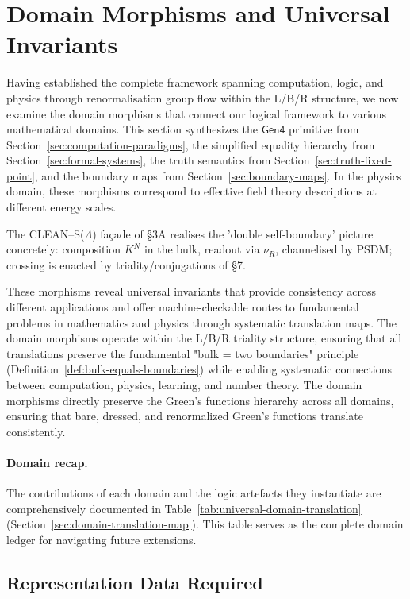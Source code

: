 \section{Domain Morphisms and Universal Invariants}
\label{sec:unified-theory}

Having established the complete framework spanning computation, logic, and physics through renormalisation group flow within the L/B/R structure, we now examine the domain morphisms that connect our logical framework to various mathematical domains. This section synthesizes the $\mathsf{Gen4}$ primitive from Section~\ref{sec:computation-paradigms}, the simplified equality hierarchy from Section~\ref{sec:formal-systems}, the truth semantics from Section~\ref{sec:truth-fixed-point}, and the boundary maps from Section~\ref{sec:boundary-maps}. In the physics domain, these morphisms correspond to effective field theory descriptions at different energy scales.

The CLEAN–S($\Lambda$) façade of §3A realises the 'double self‑boundary' picture concretely: composition $K^N$ in the bulk, readout via $\nu_R$, channelised by PSDM; crossing is enacted by triality/conjugations of §7.

These morphisms reveal universal invariants that provide consistency across different applications and offer machine-checkable routes to fundamental problems in mathematics and physics through systematic translation maps. The domain morphisms operate within the L/B/R triality structure, ensuring that all translations preserve the fundamental "bulk = two boundaries" principle (Definition~\ref{def:bulk-equals-boundaries}) while enabling systematic connections between computation, physics, learning, and number theory. The domain morphisms directly preserve the Green's functions hierarchy across all domains, ensuring that bare, dressed, and renormalized Green's functions translate consistently.

\paragraph{Domain recap.} The contributions of each domain and the logic artefacts they instantiate are comprehensively documented in Table~\ref{tab:universal-domain-translation} (Section~\ref{sec:domain-translation-map}). This table serves as the complete domain ledger for navigating future extensions.

\subsection{Representation Data Required}

